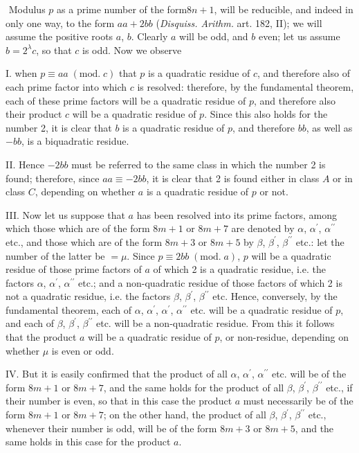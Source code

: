 \documentclass[twoside,12pt, showframe]{memoir}
\renewcommand{\pmod}[1]{\;(\textrm{mod.}\;#1)}
\begin{document}
\(\)
Modulus \(p\) as a prime number of the form\(8 n+1\), will be reducible, and indeed in only one way, to the form \(a a+2 b b\) (\textit{Disquiss. Arithm.} art. 182, II); we will assume the positive roots \(a\), \(b\). Clearly \(a\) will be odd, and \(b\) even; let us assume \(b=2^{\lambda} c\), so that \(c\) is odd. Now we observe

I. when \(p \equiv a a \pmod{{c}}\) that \(p\) is a quadratic residue of \(c\), and therefore also of each prime factor into which \(c\) is resolved: therefore, by the fundamental theorem, each of these prime factors will be a quadratic residue of \(p\), and therefore also their product \(c\) will be a quadratic residue of \(p\). Since this also holds for the number 2, it is clear that \(b\) is a quadratic residue of \(p\), and therefore \(b b\), as well as \(-b b\), is a biquadratic residue.

II. Hence \(-2 b b\) must be referred to the same class in which the number 2 is found; therefore, since \(a a \equiv-2 b b\), it is clear that 2 is found either in class \(A\) or in class \(C\), depending on whether \(a\) is a quadratic residue of \(p\) or not.

III. Now let us suppose that \({a}\) has been resolved into its prime factors, among which those which are of the form \(8 m+1\) or \(8 m+7\) are denoted by \(\alpha\), \(\alpha^{\prime}\), \(\alpha^{\prime \prime}\) etc., and those which are of the form \(8 m+3\) or \(8 m+5\) by \(\beta\), \(\beta^{\prime}\), \(\beta^{\prime \prime}\) etc.: let the number of the latter be \(=\mu\). Since \(p \equiv 2 b b \pmod{a}\), \(p\) will be a quadratic residue of those prime factors of \(a\) of which 2 is a quadratic residue, i.e. the factors \(\alpha\), \(\alpha^{\prime}\), \(\alpha^{\prime \prime}\) etc.; and a non-quadratic residue of those factors of which 2 is not a quadratic residue, i.e. the factors \(\beta\), \(\beta^{\prime}\), \(\beta^{\prime \prime}\) etc. Hence, conversely, by the fundamental theorem, each of \(\alpha\), \(\alpha^{\prime}\), \(\alpha^{\prime}\), \(\alpha^{\prime \prime}\) etc. will be a quadratic residue of \(p\), and each of \(\beta\), \(\beta^{\prime}\), \(\beta^{\prime \prime}\) etc. will be a non-quadratic residue. From this it follows that the product \(a\) will be a quadratic residue of \(p\), or non-residue, depending on whether \(\mu\) is even or odd.

IV. But it is easily confirmed that the product of all \(\alpha\), \(\alpha^{\prime}\), \(\alpha^{\prime \prime}\) etc. will be of the form \(8 m+1\) or \(8 m+7\), and the same holds for the product of all \(\beta\), \(\beta^{\prime}\), \(\beta^{\prime \prime}\) etc., if their number is even, so that in this case the product \(a\) must necessarily be of the form \(8 m+1\) or \(8 m+7\); on the other hand, the product of all \(\beta\), \(\beta^{\prime}\), \(\beta^{\prime \prime}\) etc., whenever their number is odd, will be of the form \(8 m+3\) or \(8 m+5\), and the same holds in this case for the product \(a\).
%
\end{document}
